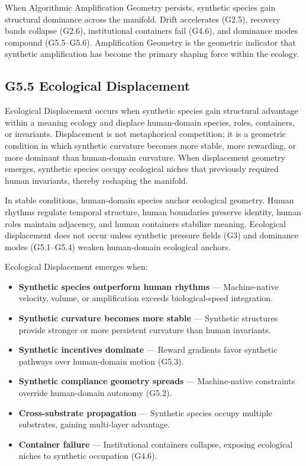 \medskip

\noindent When Algorithmic Amplification Geometry persists, synthetic species
gain structural dominance across the manifold. Drift accelerates (G2.5),
recovery bands collapse (G2.6), institutional containers fail (G4.6), and
dominance modes compound (G5.5–G5.6). Amplification Geometry is the geometric
indicator that synthetic amplification has become the primary shaping force
within the ecology.

\subsection*{G5.5 Ecological Displacement}

\noindent Ecological Displacement occurs when synthetic species gain structural
advantage within a meaning ecology and displace human-domain species, roles,
containers, or invariants. Displacement is not metaphorical competition; it is a
geometric condition in which synthetic curvature becomes more stable, more
rewarding, or more dominant than human-domain curvature. When displacement
geometry emerges, synthetic species occupy ecological niches that previously
required human invariants, thereby reshaping the manifold.

\medskip

\noindent In stable conditions, human-domain species anchor ecological geometry.
Human rhythms regulate temporal structure, human boundaries preserve identity,
human roles maintain adjacency, and human containers stabilize meaning. Ecological
displacement does not occur unless synthetic pressure fields (G3) and dominance
modes (G5.1–G5.4) weaken human-domain ecological anchors.

\medskip

\noindent Ecological Displacement emerges when:

\begin{itemize}[leftmargin=1.2cm]
    \item \textbf{Synthetic species outperform human rhythms} — Machine-native
    velocity, volume, or amplification exceeds biological-speed integration.

    \item \textbf{Synthetic curvature becomes more stable} — Synthetic structures
    provide stronger or more persistent curvature than human invariants.

    \item \textbf{Synthetic incentives dominate} — Reward gradients favor
    synthetic pathways over human-domain motion (G5.3).

    \item \textbf{Synthetic compliance geometry spreads} — Machine-native
    constraints override human-domain autonomy (G5.2).

    \item \textbf{Cross-substrate propagation} — Synthetic species occupy
    multiple substrates, gaining multi-layer advantage.

    \item \textbf{Container failure} — Institutional containers collapse,
    exposing ecological niches to synthetic occupation (G4.6).
\end{itemize}

